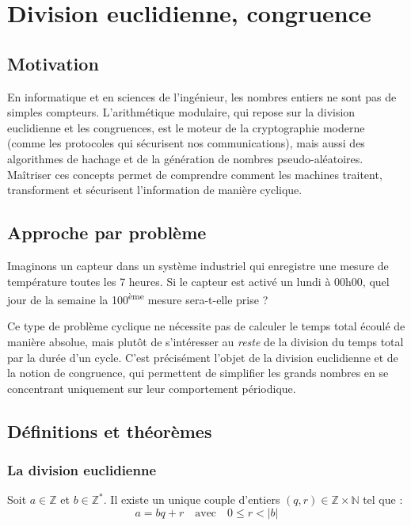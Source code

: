 \section{Division euclidienne, congruence}

\subsection{Motivation}
En informatique et en sciences de l'ingénieur, les nombres entiers ne sont pas de simples compteurs. L'arithmétique modulaire, qui repose sur la division euclidienne et les congruences, est le moteur de la cryptographie moderne (comme les protocoles qui sécurisent nos communications), mais aussi des algorithmes de hachage et de la génération de nombres pseudo-aléatoires. Maîtriser ces concepts permet de comprendre comment les machines traitent, transforment et sécurisent l'information de manière cyclique.

\subsection{Approche par problème}
Imaginons un capteur dans un système industriel qui enregistre une mesure de température toutes les 7 heures. Si le capteur est activé un lundi à 00h00, quel jour de la semaine la 100\textsuperscript{ème} mesure sera-t-elle prise ? 

Ce type de problème cyclique ne nécessite pas de calculer le temps total écoulé de manière absolue, mais plutôt de s'intéresser au \textit{reste} de la division du temps total par la durée d'un cycle. C'est précisément l'objet de la division euclidienne et de la notion de congruence, qui permettent de simplifier les grands nombres en se concentrant uniquement sur leur comportement périodique.

\subsection{Définitions et théorèmes}

\subsubsection{La division euclidienne}

\begin{theoreme}
Soit $a \in \mathbb{Z}$ et $b \in \mathbb{Z}^*$. Il existe un unique couple d'entiers $(q, r) \in \mathbb{Z} \times \mathbb{N}$ tel que :
$$a = bq + r \quad \text{avec} \quad 0 \leq r < |b|$$
\end{theoreme}


